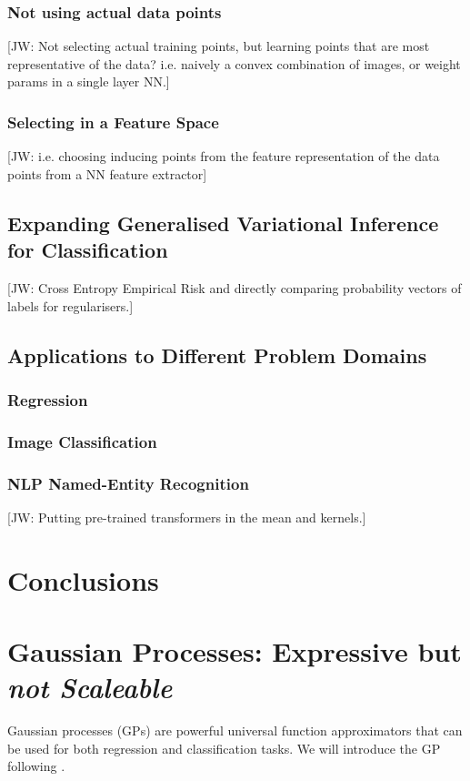 \documentclass{article}
\newcommand{\jw}[1]{{\color{gray} [JW: #1]}}
\numberwithin{equation}{section}
\begin{document}
\subsubsection{Not using actual data points}
\jw{Not selecting actual training points, but learning points that are most representative of the data? i.e. naively a convex combination of images, or weight params in a single layer NN.}
\subsubsection{Selecting in a Feature Space}
\jw{i.e. choosing inducing points from the feature representation of the data points from a NN feature extractor}

\subsection{Expanding Generalised Variational Inference for Classification}

\jw{Cross Entropy Empirical Risk and directly comparing probability vectors of labels for regularisers.}


\subsection{Applications to Different Problem Domains}

\subsubsection{Regression}

\subsubsection{Image Classification}


\subsubsection{NLP Named-Entity Recognition}
\jw{Putting pre-trained transformers in the mean and kernels.}



\newpage
\section{Conclusions}


\newpage
\section{Gaussian Processes: Expressive but \textit{not Scaleable}}
Gaussian processes (GPs) are powerful universal function approximators that can be used for both regression and classification tasks. We will introduce the GP following \cite{rasmussen2003gaussian}.
\end{document}
